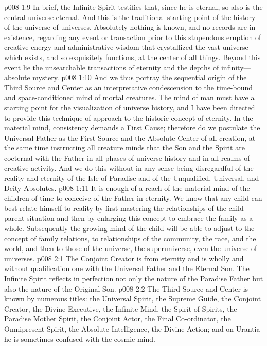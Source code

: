 \vs p008 1:9 In brief, the Infinite Spirit testifies that, since he is eternal, so also is the central universe eternal. And this is the traditional starting point of the history of the universe of universes. Absolutely nothing is known, and no records are in existence, regarding any event or transaction prior to this stupendous eruption of creative energy and administrative wisdom that crystallized the vast universe which exists, and so exquisitely functions, at the center of all things. Beyond this event lie the unsearchable transactions of eternity and the depths of infinity---absolute mystery.
\pc \vs p008 1:10 And we thus portray the sequential origin of the Third Source and Center as an interpretative condescension to the time\hyp{}bound and space\hyp{}conditioned mind of mortal creatures. The mind of man must have a starting point for the visualization of universe history, and I have been directed to provide this technique of approach to the historic concept of eternity. In the material mind, consistency demands a First Cause; therefore do we postulate the Universal Father as the First Source and the Absolute Center of all creation, at the same time instructing all creature minds that the Son and the Spirit are coeternal with the Father in all phases of universe history and in all realms of creative activity. And we do this without in any sense being disregardful of the reality and eternity of the Isle of Paradise and of the Unqualified, Universal, and Deity Absolutes.
\vs p008 1:11 It is enough of a reach of the material mind of the children of time to conceive of the Father in eternity. We know that any child can best relate himself to reality by first mastering the relationships of the child\hyp{}parent situation and then by enlarging this concept to embrace the family as a whole. Subsequently the growing mind of the child will be able to adjust to the concept of family relations, to relationships of the community, the race, and the world, and then to those of the universe, the superuniverse, even the universe of universes.
\vs p008 2:1 The Conjoint Creator is from eternity and is wholly and without qualification one with the Universal Father and the Eternal Son. The Infinite Spirit reflects in perfection not only the nature of the Paradise Father but also the nature of the Original Son.
\pc \vs p008 2:2 The Third Source and Center is known by numerous titles: the Universal Spirit, the Supreme Guide, the Conjoint Creator, the Divine Executive, the Infinite Mind, the Spirit of Spirits, the Paradise Mother Spirit, the Conjoint Actor, the Final Co\hyp{}ordinator, the Omnipresent Spirit, the Absolute Intelligence, the Divine Action; and on Urantia he is sometimes confused with the cosmic mind.
